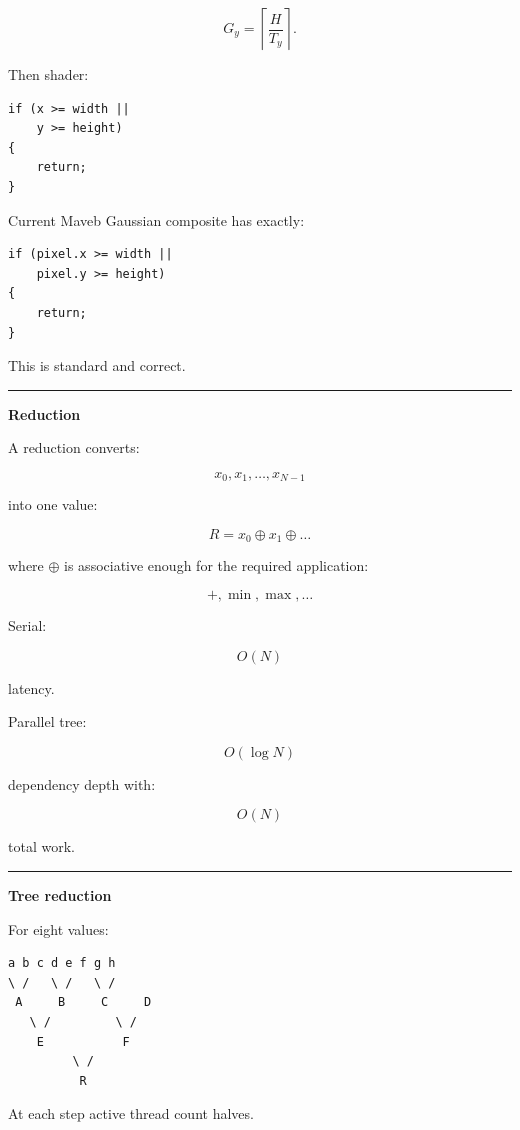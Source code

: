 \[
G_y=
\left\lceil\frac{H}{T_y}\right\rceil.
\]

Then shader:

\protect{}\label{ivlz2y}%
\begin{verbatim}
if (x >= width ||
    y >= height)
{
    return;
}
\end{verbatim}

Current Maveb Gaussian composite has exactly:

\protect{}\label{zvkv4c}%
\begin{verbatim}
if (pixel.x >= width ||
    pixel.y >= height)
{
    return;
}
\end{verbatim}

This is standard and correct.

\begin{center}\rule{0.5\linewidth}{0.5pt}\end{center}

\textbf{Reduction}

A reduction converts:

\[
x_0,x_1,\dots,x_{N-1}
\]

into one value:

\[
\boxed{
R=
x_0\oplus x_1\oplus\dots
}
\]

where \(\oplus\) is associative enough for the required application:

\[
+,\min,\max,\dots
\]

Serial:

\[
O(N)
\]

latency.

Parallel tree:

\[
O(\log N)
\]

dependency depth with:

\[
O(N)
\]

total work.

\begin{center}\rule{0.5\linewidth}{0.5pt}\end{center}

\textbf{Tree reduction}

For eight values:

\protect{}\label{uxlrwn}%
\begin{verbatim}
a b c d e f g h
\ /   \ /   \ /
 A     B     C     D
   \ /         \ /
    E           F
         \ /
          R
\end{verbatim}

At each step active thread count halves.

